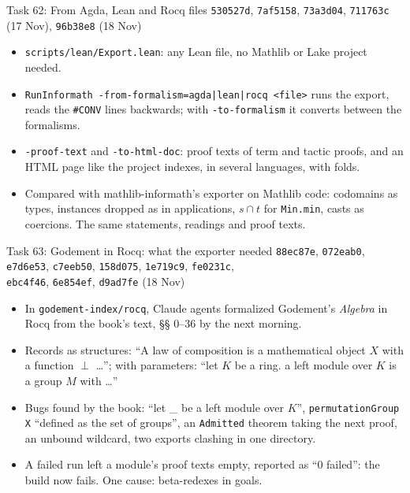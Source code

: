 \documentclass[10pt,aspectratio=169]{beamer}
\newcommand{\bad}[1]{\textcolor{warn}{#1}}
\newcommand{\ok}[1]{\textcolor{good}{#1}}
\newcommand{\commit}[1]{\texttt{\footnotesize #1}}
\begin{document}
\begin{frame}{Task 62: From Agda, Lean and Rocq files}
  \commit{530527d}, \commit{7af5158}, \commit{73a3d04}, \commit{711763c} (17 Nov),
  \commit{96b38e8} (18 Nov)
  \begin{itemize}\small
    \item \texttt{scripts/lean/Export.lean}: any Lean file, no Mathlib or Lake project needed.
    \item \texttt{RunInformath -from-formalism=agda|lean|rocq <file>} runs the export, reads the
          \texttt{\#CONV} lines backwards; with \texttt{-to-formalism} it \ok{converts between
          the formalisms}.
    \item \texttt{-proof-text} and \texttt{-to-html-doc}: proof texts of term and tactic proofs,
          and an HTML page like the project indexes, in several languages, with folds.
    \item Compared with mathlib-informath's exporter on Mathlib code: codomains as types,
          instances dropped as in applications, $s \cap t$ for \bad{\texttt{Min.min}}, casts as
          coercions. \ok{The same statements, readings and proof texts.}
  \end{itemize}
\end{frame}

\begin{frame}{Task 63: Godement in Rocq: what the exporter needed}
  \commit{88ec87e}, \commit{072eab0}, \commit{e7d6e53}, \commit{c7eeb50}, \commit{158d075},
  \commit{1e719c9}, \commit{fe0231c},\\ \commit{ebc4f46}, \commit{6e854ef}, \commit{d9ad7fe} (18 Nov)
  \begin{itemize}\small
    \item In \texttt{godement-index/rocq}, Claude agents formalized Godement's \emph{Algebra} in
          Rocq from the book's text, §§ 0--36 by the next morning.
    \item Records as structures: \ok{``A law of composition is a mathematical object $X$ with a
          function $\perp$ \ldots''}; with parameters: ``let $K$ be a ring. a left module over $K$
          is a group $M$ with \ldots''
    \item Bugs found by the book: \bad{``let \_ be a left module over $K$''}, \texttt{permutationGroup X}
          \bad{``defined as the set of groups''}, an \texttt{Admitted} theorem taking the next
          proof, an unbound wildcard, two exports clashing in one directory.
    \item \bad{A failed run left a module's proof texts empty, reported as ``0 failed''}: the
          build now fails. One cause: beta-redexes in goals.
  \end{itemize}
\end{frame}
\end{document}
